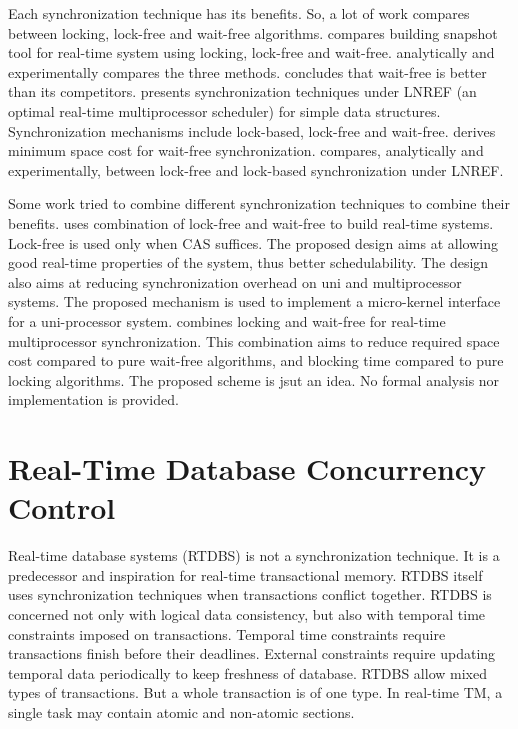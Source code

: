 \documentclass[12pt,english]{report}
\begin{document}
Each synchronization technique has its benefits. So, a lot of work
compares between locking, lock-free and wait-free algorithms. \cite{726426}
compares building snapshot tool for real-time system using locking,
lock-free and wait-free. \cite{726426} analytically and experimentally
compares the three methods. \cite{726426} concludes that wait-free
is better than its competitors. \cite{4297311} presents synchronization
techniques under LNREF \cite{4032340} (an optimal real-time multiprocessor
scheduler) for simple data structures. Synchronization mechanisms include
lock-based, lock-free and wait-free. \cite{4297311} derives minimum
space cost for wait-free synchronization. \cite{4297311} compares,
analytically and experimentally, between lock-free and lock-based
synchronization under LNREF.

Some work tried to combine different synchronization techniques to
combine their benefits. \cite{hohmuth2001pragmatic} uses combination
of lock-free and wait-free to build real-time systems. Lock-free is
used only when CAS suffices. The proposed design aims at allowing
good real-time properties of the system, thus better schedulability.
The design also aims at reducing synchronization overhead on uni and
multiprocessor systems. The proposed mechanism is used to implement
a micro-kernel interface for a uni-processor system. \cite{5953690}
combines locking and wait-free for real-time multiprocessor synchronization.
This combination aims to reduce required space cost compared to pure
wait-free algorithms, and blocking time compared to pure locking algorithms.
The proposed scheme is jsut an idea. No formal analysis nor implementation
is provided.

\section{\label{sec:db concurrency control}Real-Time Database Concurrency Control}

Real-time database systems (RTDBS) is not a synchronization technique.
It is a predecessor and inspiration for real-time transactional memory.
RTDBS itself uses synchronization techniques when transactions conflict
together. RTDBS is concerned not only with logical data consistency,
but also with temporal time constraints imposed on transactions. Temporal
time constraints require transactions finish before their deadlines.
External constraints require updating temporal data periodically to
keep freshness of database. RTDBS allow mixed types of transactions.
But a whole transaction is of one type. In real-time TM, a single
task may contain atomic and non-atomic sections.
\end{document}
